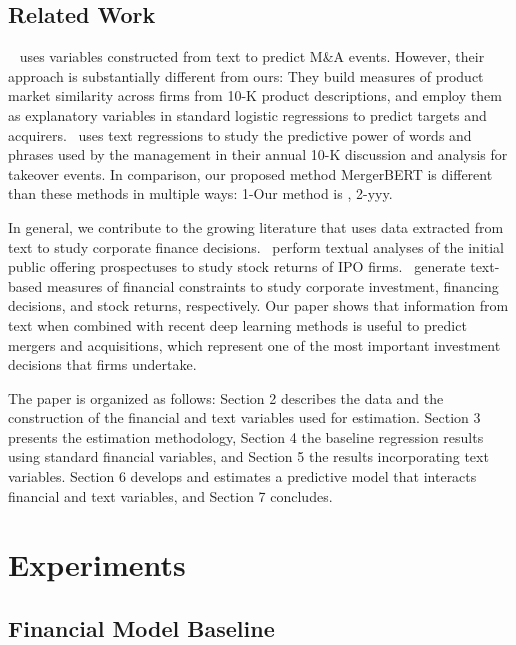 \documentclass[11pt]{article}
\begin{document}
\subsection{Related Work}

~\cite{hoberg2010} uses variables constructed from text to predict M\&A events. However, their approach is substantially different from ours: They build measures of product market similarity across
firms from 10-K product descriptions, and employ them as explanatory variables in standard
logistic regressions to predict targets and acquirers.~\cite{routledge2013} uses text regressions to study the predictive power of words and phrases used by the management in their annual
10-K discussion and analysis for takeover events. In comparison, our proposed method MergerBERT is different than these methods in
multiple ways: 1-Our method is , 2-yyy.

In general, we contribute to the growing literature that uses data extracted from
text to study corporate finance decisions.~\cite{loughran2013,jegadeesh2013} perform textual analyses of the initial public offering prospectuses to study stock
returns of IPO firms.~\cite{hoberg2015,bodnaruk2015,Buehlmaier2015} generate text-based measures of financial constraints
to study corporate investment, financing decisions, and stock returns, respectively.
Our paper shows that information from text when combined with recent deep learning methods is useful to predict mergers and acquisitions,
which represent one of the most important investment decisions that firms undertake.

The paper is organized as follows: Section 2 describes the data and the
construction of the financial and text variables used for estimation. Section 3 presents the estimation methodology,
Section 4 the baseline regression results using standard financial variables, and Section 5
the results incorporating text variables. Section 6 develops and estimates a predictive model
that interacts financial and text variables, and Section 7 concludes.

\section{Experiments}

\subsection{Financial Model Baseline}
\end{document}
